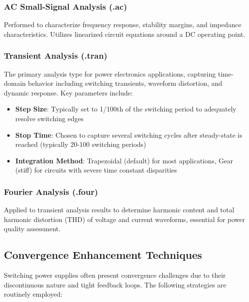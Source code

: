 \subsubsection{AC Small-Signal Analysis (.ac)}
Performed to characterize frequency response, stability margins, and impedance characteristics. Utilizes linearized circuit equations around a DC operating point.

\subsubsection{Transient Analysis (.tran)}
The primary analysis type for power electronics applications, capturing time-domain behavior including switching transients, waveform distortion, and dynamic response. Key parameters include:
\begin{itemize}
    \item \textbf{Step Size}: Typically set to 1/100th of the switching period to adequately resolve switching edges
    \item \textbf{Stop Time}: Chosen to capture several switching cycles after steady-state is reached (typically 20-100 switching periods)
    \item \textbf{Integration Method}: Trapezoidal (default) for most applications, Gear (stiff) for circuits with severe time constant disparities
\end{itemize}

\subsubsection{Fourier Analysis (.four)}
Applied to transient analysis results to determine harmonic content and total harmonic distortion (THD) of voltage and current waveforms, essential for power quality assessment.

\subsection{Convergence Enhancement Techniques}
Switching power supplies often present convergence challenges due to their discontinuous nature and tight feedback loops. The following strategies are routinely employed:

